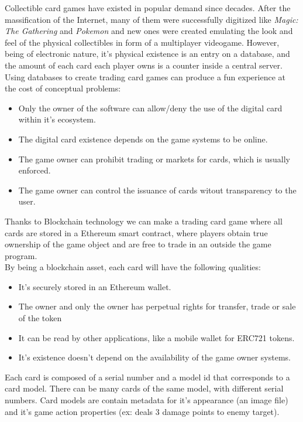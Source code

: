 \documentclass[11pt,twocolumn]{article}
\begin{document}
Collectible card games have existed in popular demand since decades. After the massification of the Internet, many of them were successfully digitized like \textit{Magic: The Gathering} and \textit{Pokemon} and new ones were created emulating the look and feel of the physical collectibles in form of a multiplayer videogame.
However, being of electronic nature, it's physical existence is an entry on a database, and the amount of each card each player owns is a counter inside a central server. Using databases to create trading card games can produce a fun experience at the cost of conceptual problems:

\begin{itemize}
        \item Only the owner of the software can allow/deny the use of the digital card within it's ecosystem.
        \item The digital card existence depends on the game systems to be online.
        \item The game owner can prohibit trading or markets for cards, which is usually enforced.
        \item The game owner can control the issuance of cards witout transparency to the user.
\end{itemize}

Thanks to Blockchain technology we can make a trading card game where all cards are stored in a Ethereum smart contract, where players obtain true ownership of the game object and are free to trade in an outside the game program.\\

By being a blockchain asset, each card will have the following qualities:

\begin{itemize}
        \item It's securely stored in an Ethereum wallet.
        \item The owner and only the owner has perpetual rights for transfer, trade or sale of the token
        \item It can be read by other applications, like a mobile wallet for ERC721 tokens.
        \item It's existence doesn't depend on the availability of the game owner systems.
\end{itemize}

Each card is composed of a serial number and a model id that corresponds to a card model. There can be many cards of the same model, with different serial numbers. Card models are contain metadata for it's appearance (an image file) and it's game action properties (ex: deals 3 damage points to enemy target).\\
\end{document}
